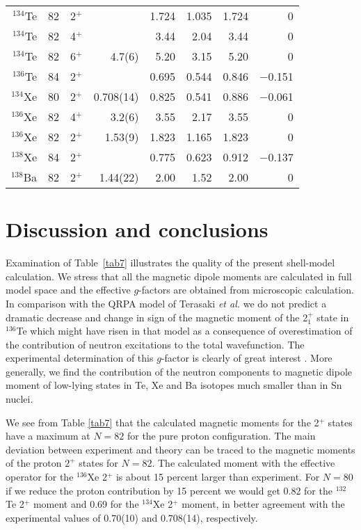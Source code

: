 \documentclass[aps,twocolumn,superscriptaddress,prc,showpacs]{revtex4}
\begin{document}
\begin{table*}
\begin{ruledtabular}
\begin{tabular}{rrrrrrrr}
 $^{134}$Te & 82 & 2$^{ + }$ &          & 1.724 & 1.035  & 1.724 & 0 \\
 $^{134}$Te & 82 & 4$^{ + }$ &          & 3.44   & 2.04  & 3.44 & 0 \\
 $^{134}$Te & 82 & 6$^{ + }$ & 4.7(6)\protect\cite{jak02}   & 5.20   & 3.15  & 5.20 & 0 \\
 $^{136}$Te & 84 & 2$^{ + }$ &          & 0.695 & 0.544  & 0.846 & $-$0.151\\
\hline
 $^{134}$Xe & 80 & 2$^{ + }$ & 0.708(14)\protect\cite{jak02}  & 0.825  & 0.541  & 0.886 & $-$0.061 \\
 $^{136}$Xe & 82 & 4$^{ + }$ & 3.2(6)\protect\cite{njs}   & 3.55   & 2.17  & 3.55 & 0 \\
 $^{136}$Xe & 82 & 2$^{ + }$ & 1.53(9)\protect\cite{jak02}  & 1.823  & 1.165  & 1.823 & 0\\
 $^{138}$Xe & 84 & 2$^{ + }$ &          & 0.775  & 0.623 & 0.912 & $-$0.137 \\
 $^{138}$Ba & 82 & 2$^{ + }$ & 1.44(22)\protect\cite{njs} & 2.00   & 1.52  & 2.00 & 0 \\
\end{tabular}
\end{ruledtabular}
\end{table*}
\endgroup

\section{Discussion and conclusions}

Examination of Table~\ref{tab7} illustrates the quality of the present shell-model calculation.
We stress that all the magnetic dipole moments are calculated in full
model space and the effective $g$-factors are obtained from microscopic calculation.
In comparison with the QRPA model of Terasaki {\em et al.} \cite{ter02} we do not predict a
dramatic decrease and change in sign of the magnetic moment of the 2$^+_1$ state in $^{136}$Te
which might have risen in that model as a consequence of overestimation of the contribution
of neutron excitations to the total wavefunction. The experimental determination
of this $g$-factor is clearly of great interest \cite{isoldete136}. 
More generally, we find the
contribution of the neutron components to magnetic dipole moment of low-lying
states in Te, Xe and Ba isotopes much smaller than in Sn nuclei.

We see from Table \ref{tab7} that the calculated magnetic moments for the 2$^+$ states
have a maximum at $N=82$ for the pure proton configuration.
The main deviation between experiment and theory can be traced to the magnetic
moments of the proton $2^+$ states for $N=82$. The calculated moment with the effective operator for
the $^{136}$Xe 2$^{ + }$ is about 15 percent larger than experiment. For $N=80$ 
if we reduce the
proton contribution by 15 percent we would get 0.82 for the $^{132}$Te 2$^{ + }$ moment
and 0.69 for the $^{134}$Xe 2$^{ + }$ moment, in better
agreement with the experimental values of 0.70(10) and 0.708(14), respectively. 
\end{document}
